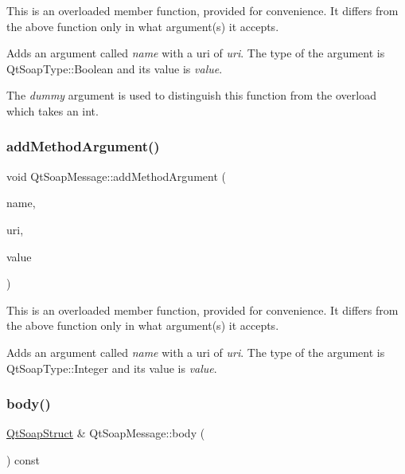This is an overloaded member function, provided for convenience. It differs from the above function only in what argument(s) it accepts.

Adds an argument called {\itshape name} with a uri of {\itshape uri}. The type of the argument is Qt\+Soap\+Type\+::\+Boolean and its value is {\itshape value}.

The {\itshape dummy} argument is used to distinguish this function from the overload which takes an int. \mbox{\label{class_qt_soap_message_a7a4d57e36365d255ec8d8fdf833c6507}} 
\subsubsection{\texorpdfstring{add\+Method\+Argument()}{addMethodArgument()}\hspace{0.1cm}{\footnotesize\ttfamily [4/4]}}
{\footnotesize\ttfamily void Qt\+Soap\+Message\+::add\+Method\+Argument (\begin{DoxyParamCaption}\item[{const Q\+String \&}]{name,  }\item[{const Q\+String \&}]{uri,  }\item[{int}]{value }\end{DoxyParamCaption})}

This is an overloaded member function, provided for convenience. It differs from the above function only in what argument(s) it accepts.

Adds an argument called {\itshape name} with a uri of {\itshape uri}. The type of the argument is Qt\+Soap\+Type\+::\+Integer and its value is {\itshape value}. \mbox{\label{class_qt_soap_message_a8c5e1cc13af9a4aebfd6d061525a69f5}} 
\subsubsection{\texorpdfstring{body()}{body()}}
{\footnotesize\ttfamily \mbox{\hyperlink{class_qt_soap_struct}{Qt\+Soap\+Struct}} \& Qt\+Soap\+Message\+::body (\begin{DoxyParamCaption}{ }\end{DoxyParamCaption}) const\hspace{0.3cm}{\ttfamily [protected]}}

